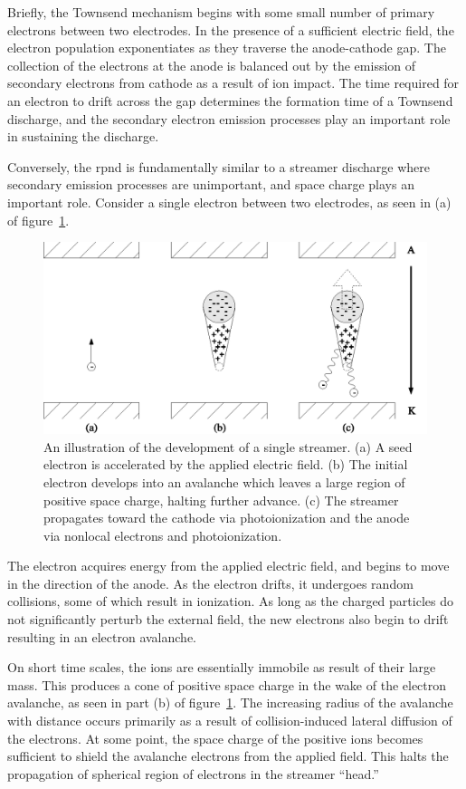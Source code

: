 Briefly, the Townsend mechanism begins with some small number of primary
electrons between two electrodes. In the presence of a sufficient
electric field, the electron population exponentiates as they traverse
the anode-cathode gap. The collection of the electrons at the anode is
balanced out by the emission of secondary electrons from cathode as a
result of ion impact. The time required for an electron to drift across
the gap determines the formation time of a Townsend discharge, and the
secondary electron emission processes play an important role in
sustaining the discharge.

Conversely, the \acs{rpnd} is fundamentally similar to a streamer
discharge where secondary emission processes are unimportant, and space
charge plays an important role. Consider a single electron between two
electrodes, as seen in (a) of figure~\ref{fig:streamer}.
\begin{figure}
  \centering
  \includegraphics{./chapters/theory/figures/streamer.eps}
  \caption{An illustration of the development of a single streamer. (a)
    A seed electron is accelerated by the applied electric field. (b) The
    initial electron develops into an avalanche which leaves a large region
    of positive space charge, halting further advance. (c) The streamer
    propagates toward the cathode via photoionization and the anode via
    nonlocal electrons and photoionization.}
  \label{fig:streamer}
\end{figure}
The electron acquires energy from the applied electric field, and begins
to move in the direction of the anode. As the electron drifts, it
undergoes random collisions, some of which result in ionization. As long
as the charged particles do not significantly perturb the external
field, the new electrons also begin to drift resulting in an electron
avalanche.

On short time scales, the ions are essentially immobile as result of
their large mass. This produces a cone of positive space charge in the
wake of the electron avalanche, as seen in part (b) of
figure~\ref{fig:streamer}. The increasing radius of the avalanche with
distance occurs primarily as a result of collision-induced lateral
diffusion of the electrons. At some point, the space charge of the
positive ions becomes sufficient to shield the avalanche electrons from
the applied field. This halts the propagation of spherical region of
electrons in the streamer ``head.''

